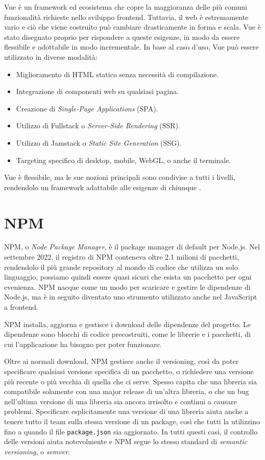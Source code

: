 Vue è un framework ed ecosistema che copre la maggioranza delle più comuni funzionalità richieste nello sviluppo frontend. Tuttavia, il web è estremamente vario e ciò che viene costruito può cambiare drasticamente in forma e scala. Vue è stato disegnato proprio per rispondere a queste esigenze, in modo da essere flessibile e adottabile in modo incrementale. In base al caso d'uso, Vue può essere utilizzato in diverse modalità:
\begin{itemize}
    \item Miglioramento di HTML statico senza necessità di compilazione.
    \item Integrazione di componenti web su qualsiasi pagina.
    \item Creazione di \textit{Single-Page Applications} (SPA).
    \item Utilizzo di Fullstack o \textit{Server-Side Rendering} (SSR).
    \item Utilizzo di Jamstack o \textit{Static Site Generation} (SSG).
    \item Targeting specifico di desktop, mobile, WebGL, o anche il terminale.
\end{itemize}
Vue è flessibile, ma le sue nozioni principali sono condivise a tutti i livelli, rendendolo un framework adattabile alle esigenze di chiunque \cite{Vue}.

\section{NPM}
NPM, o \textit{Node Package Manager}, è il package manager di default per Node.js. Nel settembre 2022, il registro di NPM conteneva oltre 2.1 milioni di pacchetti, rendendolo il più grande repository al mondo di codice che utilizza un solo linguaggio, possiamo quindi essere quasi sicuri che esista un pacchetto per ogni evenienza. NPM nacque come un modo per scaricare e gestire le dipendenze di Node.js, ma è in seguito diventato uno strumento utilizzato anche nel JavaScript a frontend.

NPM installa, aggiorna e gestisce i download delle dipendenze del progetto. Le dipendenze sono blocchi di codice precostruiti, come le librerie e i pacchetti, di cui l'applicazione ha bisogno per poter funzionare.

Oltre ai normali download, NPM gestisce anche il versioning, così da poter specificare qualsiasi versione specifica di un pacchetto, o richiedere una versione più recente o più vecchia di quella che ci serve. Spesso capita che una libreria sia compatibile solamente con una major release di un'altra libreria, o che un bug nell'ultima versione di una libreria sia ancora irrisolto e continui a causare problemi. Specificare esplicitamente una versione di una libreria aiuta anche a tenere tutto il team sulla stessa versione di un package, così che tutti la utilizzino fino a quando il file \Verb_package.json_ sia aggiornato. In tutti questi casi, il controllo delle versioni aiuta notevolmente e NPM segue lo stesso standard di \textit{semantic versioning}, o \textit{semver}.

